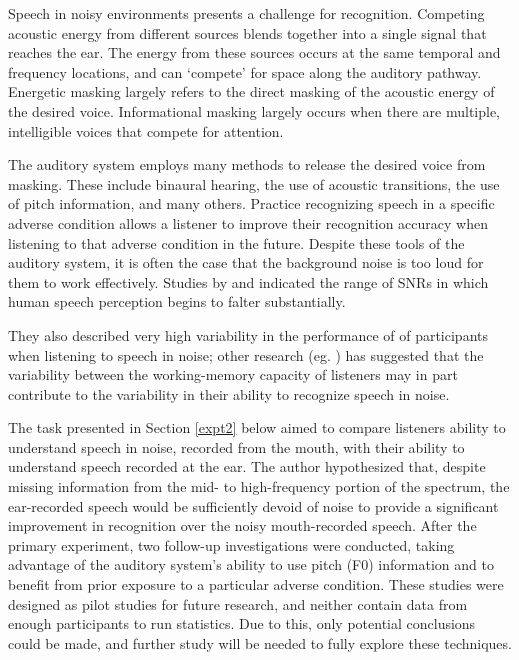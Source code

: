 Speech in noisy environments presents a challenge for recognition.  Competing acoustic energy from different sources blends together into a single signal that reaches the ear.  The energy from these sources occurs at the same temporal and frequency locations, and can `compete' for space along the auditory pathway.  Energetic masking largely refers to the direct masking of the acoustic energy of the desired voice.  Informational masking largely occurs when there are multiple, intelligible voices that compete for attention.

The auditory system employs many methods to release the desired voice from masking.  These include binaural hearing, the use of acoustic transitions, the use of pitch information, and many others.  Practice recognizing speech in a specific adverse condition allows a listener to improve their recognition accuracy when listening to that adverse condition in the future.  Despite these tools of the auditory system, it is often the case that the background noise is too loud for them to work effectively.  Studies by \cite{ding:13} and \cite{gilbert:13} indicated the range of SNRs in which human speech perception begins to falter substantially.

They also described very high variability in the performance of of participants when listening to speech in noise; other research (eg. \cite{tamati:13}) has suggested that the variability between the working-memory capacity of listeners may in part contribute to the variability in their ability to recognize speech in noise.

The task presented in Section \ref{expt2} below aimed to compare listeners ability to understand speech in noise, recorded from the mouth, with their ability to understand speech recorded at the ear.  The author hypothesized that, despite missing information from the mid- to high-frequency portion of the spectrum, the ear-recorded speech would be sufficiently devoid of noise to provide a significant improvement in recognition over the noisy mouth-recorded speech.  After the primary experiment, two follow-up investigations were conducted, taking advantage of the auditory system's ability to use pitch (F0) information and to benefit from prior exposure to a particular adverse condition.  These studies were designed as pilot studies for future research, and neither contain data from enough participants to run statistics.  Due to this, only potential conclusions could be made, and further study will be needed to fully explore these techniques. 


